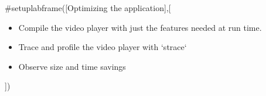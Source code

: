 #setuplabframe([Optimizing the application],[
\begin{itemize}
\item Compile the video player with just the features needed at run
      time.
\item Trace and profile the video player with `strace`
\item Observe size and time savings
\end{itemize}
])

